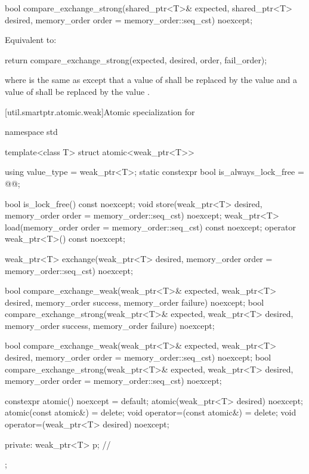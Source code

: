 %
\begin{itemdecl}
bool compare_exchange_strong(shared_ptr<T>& expected, shared_ptr<T> desired,
                             memory_order order = memory_order::seq_cst) noexcept;
\end{itemdecl}

\begin{itemdescr}
\pnum
\effects
Equivalent to:
\begin{codeblock}
return compare_exchange_strong(expected, desired, order, fail_order);
\end{codeblock}
where  is the same as 
except that a value of 
shall be replaced by the value  and
a value of 
shall be replaced by the value .
\end{itemdescr}

[util.smartptr.atomic.weak]{Atomic specialization for }
%
\begin{codeblock}
namespace std {
  template<class T> struct atomic<weak_ptr<T>> {
    using value_type = weak_ptr<T>;
    static constexpr bool is_always_lock_free = @@;

    bool is_lock_free() const noexcept;
    void store(weak_ptr<T> desired, memory_order order = memory_order::seq_cst) noexcept;
    weak_ptr<T> load(memory_order order = memory_order::seq_cst) const noexcept;
    operator weak_ptr<T>() const noexcept;

    weak_ptr<T> exchange(weak_ptr<T> desired,
                         memory_order order = memory_order::seq_cst) noexcept;

    bool compare_exchange_weak(weak_ptr<T>& expected, weak_ptr<T> desired,
                               memory_order success, memory_order failure) noexcept;
    bool compare_exchange_strong(weak_ptr<T>& expected, weak_ptr<T> desired,
                                 memory_order success, memory_order failure) noexcept;

    bool compare_exchange_weak(weak_ptr<T>& expected, weak_ptr<T> desired,
                               memory_order order = memory_order::seq_cst) noexcept;
    bool compare_exchange_strong(weak_ptr<T>& expected, weak_ptr<T> desired,
                                 memory_order order = memory_order::seq_cst) noexcept;

    constexpr atomic() noexcept = default;
    atomic(weak_ptr<T> desired) noexcept;
    atomic(const atomic&) = delete;
    void operator=(const atomic&) = delete;
    void operator=(weak_ptr<T> desired) noexcept;

  private:
    weak_ptr<T> p;              // \expos
  };
}
\end{codeblock}

